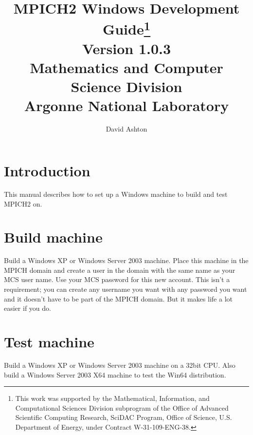 \documentclass[dvipdfm,11pt]{article}
\begin{document}
\title{{\bf MPICH2 Windows Development Guide}\thanks{This work was supported by the
    Mathematical, Information, and Computational Sciences Division
    subprogram of the Office of Advanced Scientific Computing Research,
    SciDAC Program, Office of Science, U.S. Department of Energy, under
    Contract
    W-31-109-ENG-38.}\\
  Version 1.0.3\\
  Mathematics and Computer Science Division\\
  Argonne National Laboratory}

\author{David Ashton}

\maketitle
\cleardoublepage

\tableofcontents
\clearpage

\pagestyle{headings}

\section{Introduction}
\label{sec:intro}
This manual describes how to set up a Windows machine to build and test MPICH2 on.

\section{Build machine}
\label{sec:machine}

Build a Windows XP or Windows Server 2003 machine.  Place this machine in the MPICH domain
and create a user in the domain with the same name as your MCS user name.  Use your MCS 
password for this new account.  This isn't a requirement; you can create any username you
want with any password you want and it doesn't have to be part of the MPICH domain.
But it makes life a lot easier if you do.

\section{Test machine}
\label{sec:test_machine}

Build a Windows XP or Windows Server 2003 machine on a 32bit CPU.
Also build a Windows Server 2003 X64 machine to test the Win64 distribution.

\end{document}
